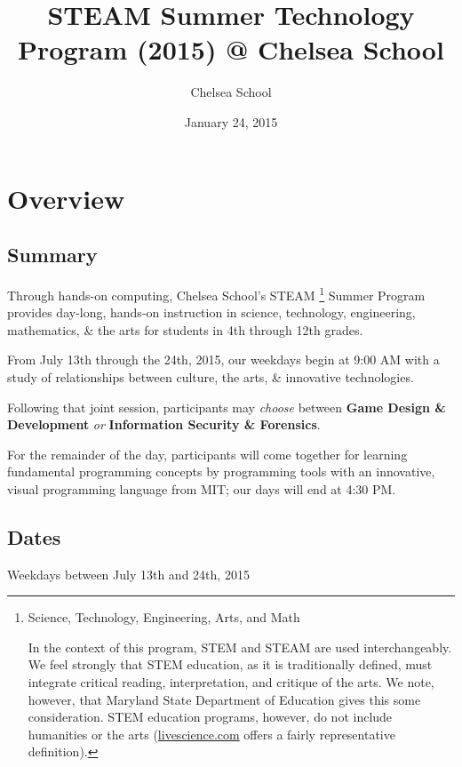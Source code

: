 \documentclass[letterpaper,10pt,english]{sphinxmanual}
\title{STEAM Summer Technology Program (2015) @ Chelsea School}
\date{January 24, 2015}
\author{Chelsea School}
\begin{document}
\maketitle
\tableofcontents
{}\label{indepth::doc}



\chapter{Overview}
\label{description:overview}\label{description:steam-summer-technology-program-2015}\label{description::doc}

\section{Summary}
\label{description:summary}
Through hands-on computing, Chelsea School's STEAM \footnote{
Science, Technology, Engineering, Arts, and Math

In the context of this program, STEM and STEAM are used interchangeably. We feel strongly that STEM education, as it is traditionally defined, must integrate critical reading, interpretation, and critique of the arts. We note, however, that Maryland State Department of Education gives this some consideration. STEM education programs, however, do not include humanities or the arts (\href{http://www.livescience.com/43296-what-is-stem-education.html}{livescience.com} offers a fairly representative definition).
} Summer Program provides day-long, hands-on instruction in science, technology, engineering, mathematics, \& the arts for students in 4th through 12th grades.

From July 13th through the 24th, 2015, our weekdays begin at 9:00 AM with a study of relationships between culture, the arts, \& innovative technologies.

Following that joint session, participants may \emph{choose} between \textbf{Game Design \& Development} \emph{or} \textbf{Information Security \& Forensics}.

For the remainder of the day, participants will come together for learning fundamental programming concepts by programming tools with an innovative, visual programming language from MIT; our days will end at 4:30 PM.


\section{Dates}
\label{description:dates}
Weekdays between July 13th and 24th, 2015
\end{document}
